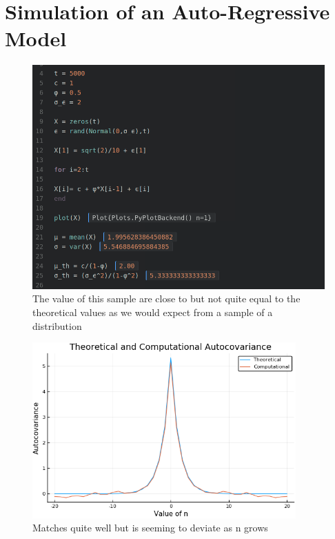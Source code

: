 \documentclass[a4paper,12pt,notitlepage]{article}
\begin{document}
\section{Simulation of an Auto-Regressive Model}

\begin{figure}[h]
    \centering
    \includegraphics[width=\textwidth]{th_em.png}
    \caption{The value of this sample are close to but not quite equal to the theoretical values as we would expect from a sample of a distribution}
\end{figure}

\begin{figure}[h]
    \centering

        \centering
        \includegraphics[width=0.9\textwidth]{smallautocov.png}
        \caption{Matches quite well but is seeming to deviate as n grows}
\end{figure}
\end{document}
